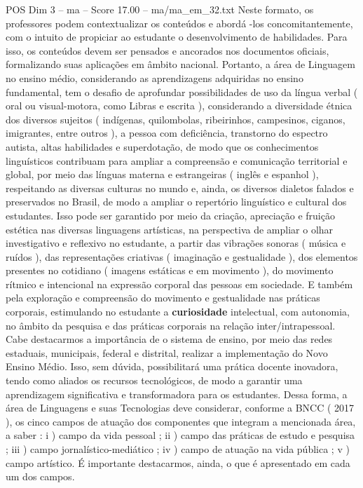 \begin{textsample}{POS Dim 3 – ma – Score 17.00 – ma/ma\_em\_32.txt}
Neste formato, os professores podem contextualizar os conteúdos e abordá -los concomitantemente, com o intuito de propiciar ao estudante o desenvolvimento de habilidades.
Para isso, os conteúdos devem ser pensados e ancorados nos documentos oficiais, formalizando suas aplicações em âmbito nacional.
Portanto, a área de Linguagem no ensino médio, considerando as aprendizagens adquiridas no ensino fundamental, tem o desafio de aprofundar possibilidades de uso da língua verbal ( oral ou visual-motora, como Libras e escrita ), considerando a diversidade étnica dos diversos sujeitos ( indígenas, quilombolas, ribeirinhos, campesinos, ciganos, imigrantes, entre outros ), a pessoa com deficiência, transtorno do espectro autista, altas habilidades e superdotação, de modo que os conhecimentos linguísticos contribuam para ampliar a compreensão e comunicação territorial e global, por meio das línguas materna e estrangeiras ( inglês e espanhol ), respeitando as diversas culturas no mundo e, ainda, os diversos dialetos falados e preservados no Brasil, de modo a ampliar o repertório linguístico e cultural dos estudantes.
Isso pode ser garantido por meio da criação, apreciação e fruição estética nas diversas linguagens artísticas, na perspectiva de ampliar o olhar investigativo e reflexivo no estudante, a partir das vibrações sonoras ( música e ruídos ), das representações criativas ( imaginação e gestualidade ), dos elementos presentes no cotidiano ( imagens estáticas e em movimento ), do movimento rítmico e intencional na expressão corporal das pessoas em sociedade.
E também pela exploração e compreensão do movimento e gestualidade nas práticas corporais, estimulando no estudante a \textbf{curiosidade} intelectual, com autonomia, no âmbito da pesquisa e das práticas corporais na relação inter/intrapessoal.
Cabe destacarmos a importância de o sistema de ensino, por meio das redes estaduais, municipais, federal e distrital, realizar a implementação do Novo Ensino Médio.
Isso, sem dúvida, possibilitará uma prática docente inovadora, tendo como aliados os recursos tecnológicos, de modo a garantir uma aprendizagem significativa e transformadora para os estudantes.
Dessa forma, a área de Linguagens e suas Tecnologias deve considerar, conforme a BNCC ( 2017 ), os cinco campos de atuação dos componentes que integram a mencionada área, a saber : i ) campo da vida pessoal ; ii ) campo das práticas de estudo e pesquisa ; iii ) campo jornalístico-mediático ; iv ) campo de atuação na vida pública ; v ) campo artístico.
É importante destacarmos, ainda, o que é apresentado em cada um dos campos.

\end{textsample}
